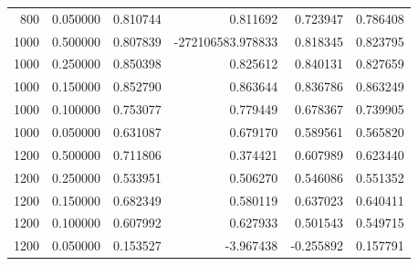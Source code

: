 \begin{tabular}{rrrrrr}
800 & 0.050000 & 0.810744 & 0.811692 & 0.723947 & 0.786408 \\
1000 & 0.500000 & 0.807839 & -272106583.978833 & 0.818345 & 0.823795 \\
1000 & 0.250000 & 0.850398 & 0.825612 & 0.840131 & 0.827659 \\
1000 & 0.150000 & 0.852790 & 0.863644 & 0.836786 & 0.863249 \\
1000 & 0.100000 & 0.753077 & 0.779449 & 0.678367 & 0.739905 \\
1000 & 0.050000 & 0.631087 & 0.679170 & 0.589561 & 0.565820 \\
1200 & 0.500000 & 0.711806 & 0.374421 & 0.607989 & 0.623440 \\
1200 & 0.250000 & 0.533951 & 0.506270 & 0.546086 & 0.551352 \\
1200 & 0.150000 & 0.682349 & 0.580119 & 0.637023 & 0.640411 \\
1200 & 0.100000 & 0.607992 & 0.627933 & 0.501543 & 0.549715 \\
1200 & 0.050000 & 0.153527 & -3.967438 & -0.255892 & 0.157791 \\
\bottomrule
\end{tabular}
